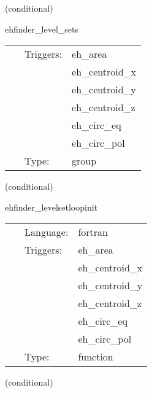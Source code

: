 \vspace{5mm}

   (conditional) 

\hspace{5mm} ehfinder\_level\_sets 

\hspace{5mm}{\it loop over the level set functions } 


\hspace{5mm}

 \begin{tabular*}{160mm}{cll} 
~ & Triggers:  & eh\_area \\ 
~& ~ &eh\_centroid\_x\\ 
~& ~ &eh\_centroid\_y\\ 
~& ~ &eh\_centroid\_z\\ 
~& ~ &eh\_circ\_eq\\ 
~& ~ &eh\_circ\_pol\\ 
~ & Type:  & group \\ 
\end{tabular*} 


\vspace{5mm}

   (conditional) 

\hspace{5mm} ehfinder\_levelsetloopinit 

\hspace{5mm}{\it initialize the loop counter over the level set functions } 


\hspace{5mm}

 \begin{tabular*}{160mm}{cll} 
~ & Language:  & fortran \\ 
~ & Triggers:  & eh\_area \\ 
~& ~ &eh\_centroid\_x\\ 
~& ~ &eh\_centroid\_y\\ 
~& ~ &eh\_centroid\_z\\ 
~& ~ &eh\_circ\_eq\\ 
~& ~ &eh\_circ\_pol\\ 
~ & Type:  & function \\ 
\end{tabular*} 


\vspace{5mm}

   (conditional) 

